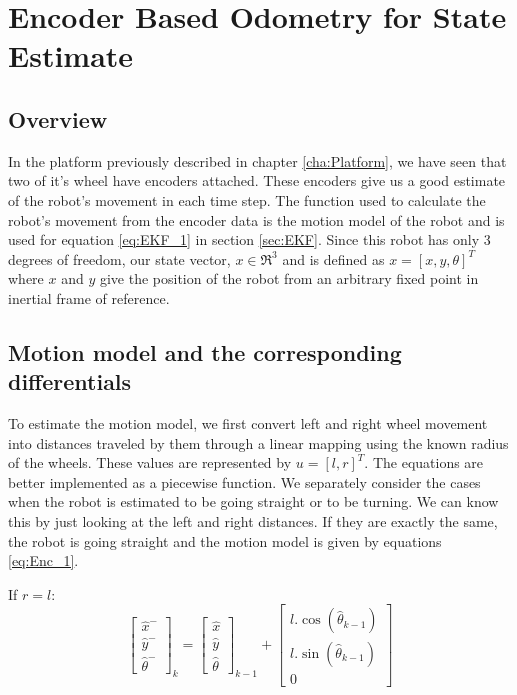 \chapter{Encoder Based Odometry for State Estimate}

\section{Overview}

In the platform previously described in chapter \ref{cha:Platform}, we have seen that two of it's wheel have encoders attached. These encoders give us a good estimate of the robot's movement in each time step. The function used to calculate the robot's movement from the encoder data is the motion model of the robot and is used for equation \ref{eq:EKF_1} in section \ref{sec:EKF}. Since this robot has only 3 degrees of freedom, our state vector, $ x \in \Re^3 $ and is defined as $ x = [x,y,\theta]^T $ where $ x $ and $ y $ give the position of the robot from an arbitrary fixed point in inertial frame of reference. 

\section{Motion model and the corresponding differentials}

To estimate the motion model, we first convert left and right wheel movement into distances traveled by them through a linear mapping using the known radius of the wheels. These values are represented by $ u = [ l, r ]^T $. The equations are better implemented as a piecewise function. We separately consider the cases when the robot is estimated to be going straight or to be turning. We can know this by just looking at the left and right distances. If they are exactly the same, the robot is going straight and the motion model is given by equations \ref{eq:Enc_1}. 

If $ r = l $:
\begin{equation}
\label{eq:Enc_1}
	\begin{bmatrix}
		\hat{x}^-\\\hat{y}^-\\\hat{\theta}^-
	\end{bmatrix}_k
	=
	\begin{bmatrix}
		\hat{x}\\\hat{y}\\\hat{\theta}
	\end{bmatrix}_{k-1}
	+
	\begin{bmatrix}
		l.\cos(\hat{\theta}_{k-1})\\
		l.\sin(\hat{\theta}_{k-1})\\
		0
	\end{bmatrix}
\end{equation}	

